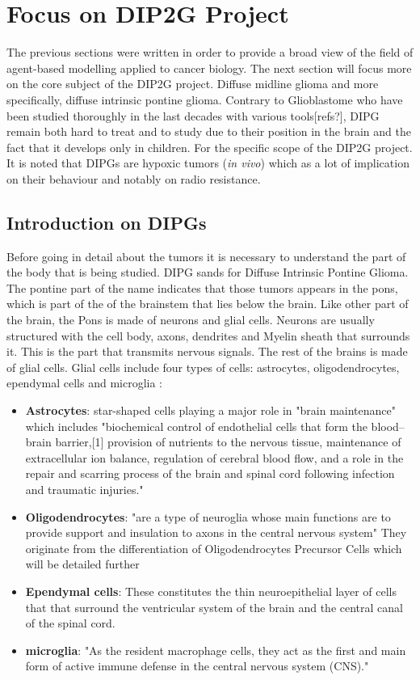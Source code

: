\documentclass[11pt,a4paper]{article}
\begin{document}
\section{Focus on DIP2G Project}
The previous sections were written in order to provide a broad view of the field of agent-based modelling applied to cancer biology. The next section will focus more on the core subject of the DIP2G project. Diffuse midline glioma and more specifically, diffuse intrinsic pontine glioma. Contrary to Glioblastome who have been studied thoroughly in the last decades with various tools[refs?], DIPG remain both hard to treat and to study due to their position in the brain and the fact that it develops only in children. For the specific scope of the DIP2G project. It is noted that DIPGs are hypoxic tumors (\textit{in vivo}) which as a lot of implication on their behaviour and notably on radio resistance.\cite{Cook2021}

\subsection{Introduction on DIPGs}
Before going in detail about the tumors it is necessary to understand the part of the body that is being studied. DIPG sands for Diffuse Intrinsic Pontine Glioma. The pontine part of the name indicates that those tumors appears in the pons, which is part of the of the brainstem that lies below the brain. Like other part of the brain, the Pons is made of neurons and glial cells. Neurons are usually structured with the cell body, axons, dendrites and Myelin sheath that surrounds it. This is the part that transmits nervous signals. The rest of the brains is made of glial cells.\cite{cleveland_clinic} Glial cells include four types of cells: astrocytes, oligodendrocytes, ependymal cells and microglia :
\begin{itemize}
\item \textbf{Astrocytes}:  star-shaped cells playing a major role in "brain maintenance" which includes "biochemical control of endothelial cells that form the blood–brain barrier,[1] provision of nutrients to the nervous tissue, maintenance of extracellular ion balance, regulation of cerebral blood flow, and a role in the repair and scarring process of the brain and spinal cord following infection and traumatic injuries."\cite{Astro_wiki}
\item \textbf{Oligodendrocytes}: "are a type of neuroglia whose main functions are to provide support and insulation to axons in the central nervous system"\cite{oligo_wiki} They originate from the differentiation of Oligodendrocytes Precursor Cells which will be detailed further
\item \textbf{Ependymal cells}: These constitutes the thin neuroepithelial layer of cells that that surround the ventricular system of the brain and the central canal of the spinal cord.
\item \textbf{microglia}: "As the resident macrophage cells, they act as the first and main form of active immune defense in the central nervous system (CNS)." \cite{micro_wiki}
\end{itemize}
\end{document}
